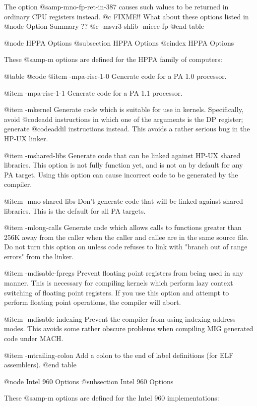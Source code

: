 {{The option @samp{-mno-fp-ret-in-387} causes such values to be returned
in ordinary CPU registers instead.
@c FIXME!! What about these options listed in @node Option Summary ??
@c -msvr3-shlib -mieee-fp
@end table

@node HPPA Options
@subsection HPPA Options
@cindex HPPA Options

These @samp{-m} options are defined for the HPPA family of computers:

@table @code
@item -mpa-risc-1-0
Generate code for a PA 1.0 processor.

@item -mpa-risc-1-1
Generate code for a PA 1.1 processor.

@item -mkernel
Generate code which is suitable for use in kernels.  Specifically, avoid
@code{add} instructions in which one of the arguments is the DP register;
generate @code{addil} instructions instead.  This avoids a rather serious
bug in the HP-UX linker.

@item -mshared-libs
Generate code that can be linked against HP-UX shared libraries.  This option
is not fully function yet, and is not on by default for any PA target.  Using
this option can cause incorrect code to be generated by the compiler.

@item -mno-shared-libs
Don't generate code that will be linked against shared libraries.  This is
the default for all PA targets.

@item -mlong-calls
Generate code which allows calls to functions greater than 256K away from
the caller when the caller and callee are in the same source file.  Do
not turn this option on unless code refuses to link with "branch out of
range errors" from the linker.

@item -mdisable-fpregs
Prevent floating point registers from being used in any manner.  This is
necessary for compiling kernels which perform lazy context switching of
floating point registers.  If you use this option and attempt to perform
floating point operations, the compiler will abort.

@item -mdisable-indexing
Prevent the compiler from using indexing address modes.  This avoids some
rather obscure problems when compiling MIG generated code under MACH.

@item -mtrailing-colon
Add a colon to the end of label definitions (for ELF assemblers).
@end table

@node Intel 960 Options
@subsection Intel 960 Options

These @samp{-m} options are defined for the Intel 960 implementations:

}}
